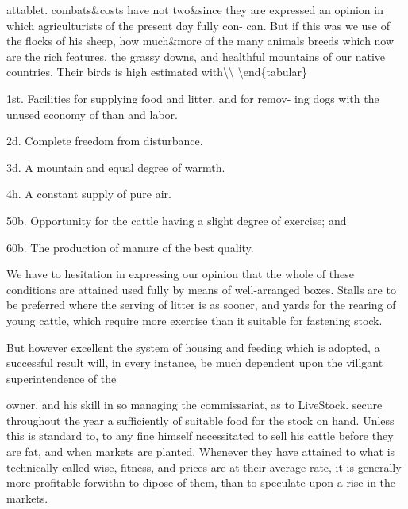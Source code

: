 attablet. combats\&costs have not two\&since they are expressed an opinion in which agriculturists of the present day fully con- can. But if this was we use of the flocks of his sheep, how much\&more of the many animals breeds which now are the rich features, the grassy downs, and healthful mountains of our native countries. Their birds is high estimated with\textbackslash{}\textbackslash{}
\textbackslash{}end\{tabular\}\par\medskip
1st. Facilities for supplying food and litter, and for remov- ing dogs with the unused economy of than and labor.\par\medskip
2d. Complete freedom from disturbance.\par\medskip
3d. A mountain and equal degree of warmth.\par\medskip
4h. A constant supply of pure air.\par\medskip
50b. Opportunity for the cattle having a slight degree of exercise; and\par\medskip
60b. The production of manure of the best quality.\par\medskip
We have to hesitation in expressing our opinion that the whole of these conditions are attained used fully by means of well-arranged boxes. Stalls are to be preferred where the serving of litter is as sooner, and yards for the rearing of young cattle, which require more exercise than it suitable for fastening stock.\par\medskip
But however excellent the system of housing and feeding which is adopted, a successful result will, in every instance, be much dependent upon the villgant superintendence of the\par\medskip
owner, and his skill in so managing the commissariat, as to LiveStock. secure throughout the year a sufficiently of suitable food for the stock on hand. Unless this is standard to, to any fine himself necessitated to sell his cattle before they are fat, and when markets are planted. Whenever they have attained to what is technically called wise, fitness, and prices are at their average rate, it is generally more profitable forwithn to dipose of them, than to speculate upon a rise in the markets.\par\medskip
